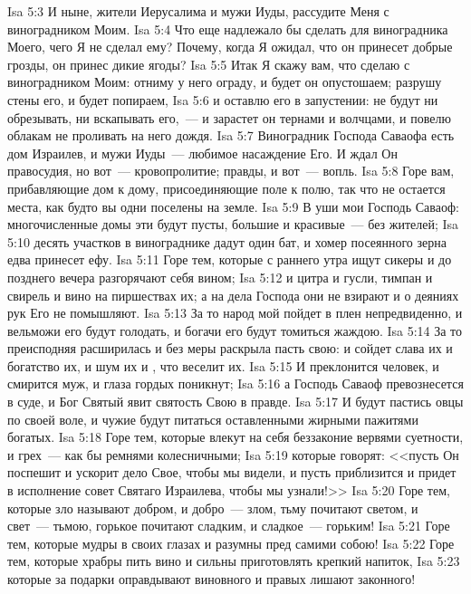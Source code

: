 \vs Isa 5:3 И ныне, жители Иерусалима и мужи Иуды, рассудите Меня с виноградником Моим.
\vs Isa 5:4 Что еще надлежало бы сделать для виноградника Моего, чего Я не сделал ему? Почему, когда Я ожидал, что он принесет добрые грозды, он принес дикие ягоды?
\vs Isa 5:5 Итак Я скажу вам, что сделаю с виноградником Моим: отниму у него ограду, и будет он опустошаем; разрушу стены его, и будет попираем,
\vs Isa 5:6 и оставлю его в запустении: не будут ни обрезывать, ни вскапывать его,~--- и зарастет он тернами и волчцами, и повелю облакам не проливать на него дождя.
\vs Isa 5:7 Виноградник Господа Саваофа есть дом Израилев, и мужи Иуды~--- любимое насаждение Его. И ждал Он правосудия, но вот~--- кровопролитие;  правды, и вот~--- вопль.
\rsbpar\vs Isa 5:8 Горе вам, прибавляющие дом к дому, присоединяющие поле к полю, так что  не остается места, как будто вы одни поселены на земле.
\vs Isa 5:9 В уши мои  Господь Саваоф: многочисленные домы эти будут пусты, большие и красивые~--- без жителей;
\vs Isa 5:10 десять участков в винограднике дадут один бат, и хомер посеянного зерна едва принесет ефу.
\vs Isa 5:11 Горе тем, которые с раннего утра ищут сикеры и до позднего вечера разгорячают себя вином;
\vs Isa 5:12 и цитра и гусли, тимпан и свирель и вино на пиршествах их; а на дела Господа они не взирают и о деяниях рук Его не помышляют.
\vs Isa 5:13 За то народ мой пойдет в плен непредвиденно, и вельможи его будут голодать, и богачи его будут томиться жаждою.
\vs Isa 5:14 За то преисподняя расширилась и без меры раскрыла пасть свою: и сойдет  слава их и богатство их, и шум их и , что веселит их.
\vs Isa 5:15 И преклонится человек, и смирится муж, и глаза гордых поникнут;
\vs Isa 5:16 а Господь Саваоф превознесется в суде, и Бог Святый явит святость Свою в правде.
\vs Isa 5:17 И будут пастись овцы по своей воле, и чужие будут питаться оставленными жирными пажитями богатых.
\vs Isa 5:18 Горе тем, которые влекут на себя беззаконие вервями суетности, и грех~--- как бы ремнями колесничными;
\vs Isa 5:19 которые говорят: <<пусть Он поспешит и ускорит дело Свое, чтобы мы видели, и пусть приблизится и придет в исполнение совет Святаго Израилева, чтобы мы узнали!>>
\vs Isa 5:20 Горе тем, которые зло называют добром, и добро~--- злом, тьму почитают светом, и свет~--- тьмою, горькое почитают сладким, и сладкое~--- горьким!
\vs Isa 5:21 Горе тем, которые мудры в своих глазах и разумны пред самими собою!
\vs Isa 5:22 Горе тем, которые храбры пить вино и сильны приготовлять крепкий напиток,
\vs Isa 5:23 которые за подарки оправдывают виновного и правых лишают законного!
